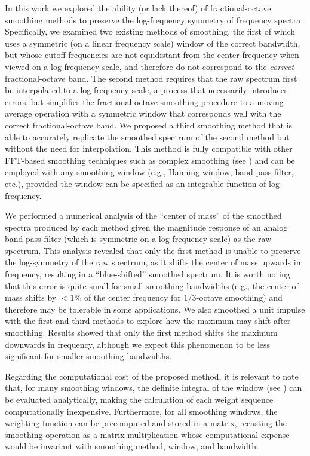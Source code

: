 In this work we explored the ability (or lack thereof) of fractional-octave smoothing methods to preserve the log-frequency symmetry of frequency spectra.
Specifically, we examined two existing methods of smoothing, the first of which uses a symmetric (on a linear frequency scale) window of the correct bandwidth, but whose cutoff frequencies are not equidistant from the center frequency when viewed on a log-frequency scale, and therefore do not correspond to the \textit{correct} fractional-octave band.
The second method requires that the raw spectrum first be interpolated to a log-frequency scale, a process that necessarily introduces errors, but simplifies the fractional-octave smoothing procedure to a moving-average operation with a symmetric window that corresponds well with the correct fractional-octave band.
We proposed a third smoothing method that is able to accurately replicate the smoothed spectrum of the second method but without the need for interpolation.
This method is fully compatible with other FFT-based smoothing techniques such as complex smoothing (see \citet{HatziantoniouMourjopoulos2000}) and can be employed with any smoothing window (e.g., Hanning window, band-pass filter, etc.), provided the window can be specified as an integrable function of log-frequency.

We performed a numerical analysis of the ``center of mass'' of the smoothed spectra produced by each method given the magnitude response of an analog band-pass filter (which is symmetric on a log-frequency scale) as the raw spectrum.
This analysis revealed that only the first method is unable to preserve the log-symmetry of the raw spectrum, as it shifts the center of mass upwards in frequency, resulting in a ``blue-shifted'' smoothed spectrum.
It is worth noting that this error is quite small for small smoothing bandwidths (e.g., the center of mass shifts by $< 1 \%$ of the center frequency for $1/3$-octave smoothing) and therefore may be tolerable in some applications.
We also smoothed a unit impulse with the first and third methods to explore how the maximum may shift after smoothing.
Results showed that only the first method shifts the maximum downwards in frequency, although we expect this phenomenon to be less significant for smaller smoothing bandwidths.

Regarding the computational cost of the proposed method, it is relevant to note that, for many smoothing windows, the definite integral of the window (see ) can be evaluated analytically, making the calculation of each weight sequence computationally inexpensive.
Furthermore, for all smoothing windows, the weighting function can be precomputed and stored in a matrix, recasting the smoothing operation as a matrix multiplication whose computational expense would be invariant with smoothing method, window, and bandwidth.


